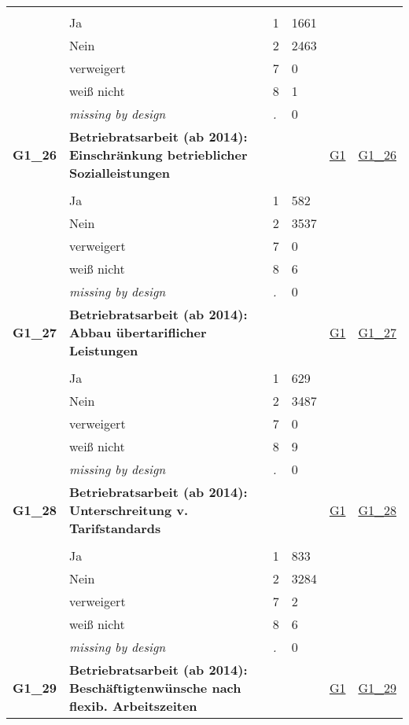 \begin{longtable}{| L{2.45cm} | L{6cm} | C{1.5cm} | R{1cm} | C{2.25cm} | C{2.25cm} |}
   &  &  &  &  &  \\ 
   & Ja & 1 & 1661 &  &  \\ 
   & Nein & 2 & 2463 &  &  \\ 
   & verweigert & 7 & 0 &  &  \\ 
   & weiß nicht & 8 & 1 &  &  \\ 
   & \textit{missing by design} & \textit{.} & 0 &  &  \\ 
   \midrule
\textbf{G1\_26}\label{var:G1:26} & \textbf{Betriebratsarbeit (ab 2014): Einschränkung betrieblicher Sozialleistungen} &  &  & \hyperref[G1]{G1} & \hyperref[var:suf:G1:26]{G1\_26} \\ 
   &  &  &  &  &  \\ 
   & Ja & 1 & 582 &  &  \\ 
   & Nein & 2 & 3537 &  &  \\ 
   & verweigert & 7 & 0 &  &  \\ 
   & weiß nicht & 8 & 6 &  &  \\ 
   & \textit{missing by design} & \textit{.} & 0 &  &  \\ 
   \midrule
\textbf{G1\_27}\label{var:G1:27} & \textbf{Betriebratsarbeit (ab 2014): Abbau übertariflicher Leistungen} &  &  & \hyperref[G1]{G1} & \hyperref[var:suf:G1:27]{G1\_27} \\ 
   &  &  &  &  &  \\ 
   & Ja & 1 & 629 &  &  \\ 
   & Nein & 2 & 3487 &  &  \\ 
   & verweigert & 7 & 0 &  &  \\ 
   & weiß nicht & 8 & 9 &  &  \\ 
   & \textit{missing by design} & \textit{.} & 0 &  &  \\ 
   \midrule
\textbf{G1\_28}\label{var:G1:28} & \textbf{Betriebratsarbeit (ab 2014): Unterschreitung v. Tarifstandards} &  &  & \hyperref[G1]{G1} & \hyperref[var:suf:G1:28]{G1\_28} \\ 
   &  &  &  &  &  \\ 
   & Ja & 1 & 833 &  &  \\ 
   & Nein & 2 & 3284 &  &  \\ 
   & verweigert & 7 & 2 &  &  \\ 
   & weiß nicht & 8 & 6 &  &  \\ 
   & \textit{missing by design} & \textit{.} & 0 &  &  \\ 
   \midrule
\textbf{G1\_29}\label{var:G1:29} & \textbf{Betriebratsarbeit (ab 2014): Beschäftigtenwünsche nach flexib. Arbeitszeiten} &  &  & \hyperref[G1]{G1} & \hyperref[var:suf:G1:29]{G1\_29} \\ 

\end{longtable}

